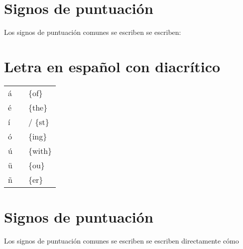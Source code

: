 \documentclass[draft]{article}
\newcommand{\mytildetable}[1]{%
	\enskip\begin{tabular}[t]{l|r|l} 
		\hline #1 \hline
	\end{tabular}\enskip}
\begin{document}
\section{Signos de puntuación}

Los signos de puntuación comunes se escriben se escriben:



\section{Letra en español con diacrítico}

\begin{center}
	\mytildetable{
		á &\braille{{of}}     & \{of\}      \\
		é &\braille{{the}}    & \{the\}     \\
		í &\braille{{st}}     & / \{st\}    \\
		ó &\braille{{ing}}    & \{ing\}     \\
		ú &\braille{{with}}   & \{with\}    \\
		ü & \braille{{ou}}    & \{ou\}     \\
		ñ & \braille{{er}}    & \{er\}     \\
	}
\end{center}




\section{Signos de puntuación}

Los signos de puntuación comunes se escriben se escriben directamente cómo
\end{document}
